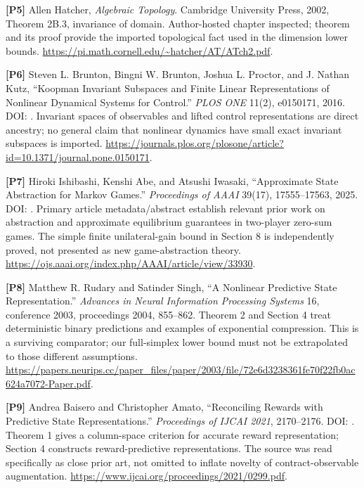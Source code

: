 \documentclass[11pt,a4paper]{article}
\begin{document}
\textbf{{[}P5{]}} Allen Hatcher, \emph{Algebraic Topology}. Cambridge
University Press, 2002, Theorem 2B.3, invariance of domain.
Author-hosted chapter inspected; theorem and its proof provide the
imported topological fact used in the dimension lower bounds.
\url{https://pi.math.cornell.edu/~hatcher/AT/ATch2.pdf}.

\textbf{{[}P6{]}} Steven L. Brunton, Bingni W. Brunton, Joshua L.
Proctor, and J. Nathan Kutz, ``Koopman Invariant Subspaces and Finite
Linear Representations of Nonlinear Dynamical Systems for Control.''
\emph{PLOS ONE} 11(2), e0150171, 2016. DOI:
. Invariant spaces of observables and
lifted control representations are direct ancestry; no general claim
that nonlinear dynamics have small exact invariant subspaces is
imported.
\url{https://journals.plos.org/plosone/article?id=10.1371/journal.pone.0150171}.

\textbf{{[}P7{]}} Hiroki Ishibashi, Kenshi Abe, and Atsushi Iwasaki,
``Approximate State Abstraction for Markov Games.'' \emph{Proceedings of
AAAI} 39(17), 17555--17563, 2025. DOI: .
Primary article metadata/abstract establish relevant prior work on
abstraction and approximate equilibrium guarantees in two-player
zero-sum games. The simple finite unilateral-gain bound in Section 8 is
independently proved, not presented as new game-abstraction theory.
\url{https://ojs.aaai.org/index.php/AAAI/article/view/33930}.

\textbf{{[}P8{]}} Matthew R. Rudary and Satinder Singh, ``A Nonlinear
Predictive State Representation.'' \emph{Advances in Neural Information
Processing Systems} 16, conference 2003, proceedings 2004, 855--862.
Theorem 2 and Section 4 treat deterministic binary predictions and
examples of exponential compression. This is a surviving comparator; our
full-simplex lower bound must not be extrapolated to those different
assumptions.
\url{https://papers.neurips.cc/paper_files/paper/2003/file/72e6d3238361fe70f22fb0ac624a7072-Paper.pdf}.

\textbf{{[}P9{]}} Andrea Baisero and Christopher Amato, ``Reconciling
Rewards with Predictive State Representations.'' \emph{Proceedings of
IJCAI 2021}, 2170--2176. DOI: . Theorem 1
gives a column-space criterion for accurate reward representation;
Section 4 constructs reward-predictive representations. The source was
read specifically as close prior art, not omitted to inflate novelty of
contract-observable augmentation.
\url{https://www.ijcai.org/proceedings/2021/0299.pdf}.
\end{document}

